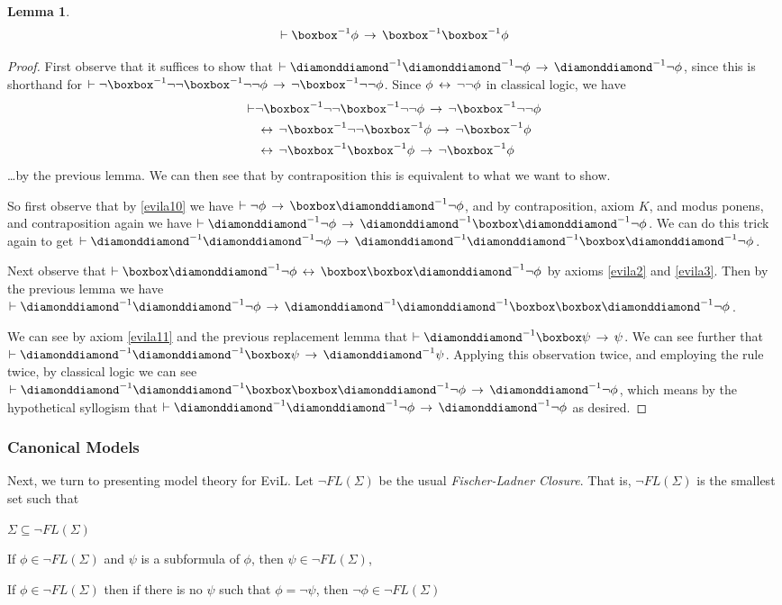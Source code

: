 \documentclass[11pt]{article}
\newtheorem{lemma}[theorem]{Lemma}
\newcommand{\BB}{\boxbox}
\newcommand{\DD}{\diamonddiamond}
\begin{document}
\begin{lemma}
\[ \vdash \BB^{-1} \phi \IMPL \BB^{-1}\BB^{-1}\phi \]
\end{lemma}
\begin{proof}
	\item First observe that it suffices to show that $\vdash\DD^{-1}\DD^{-1}\neg\phi \IMPL \DD^{-1}\neg\phi$, since this is shorthand for $\vdash\neg\BB^{-1}\neg\neg\BB^{-1}\neg\neg\phi \IMPL \neg\BB^{-1}\neg\neg\phi$.  Since $\phi \,\leftrightarrow\, \neg\neg\phi$ in classical logic, we have
	\begin{align*} \vdash & \neg\BB^{-1}\neg\neg\BB^{-1}\neg\neg\phi \IMPL \neg\BB^{-1}\neg\neg\phi \\
			& \IFF \neg\BB^{-1}\neg\neg\BB^{-1}\phi \IMPL \neg\BB^{-1}\phi\\
			& \IFF \neg\BB^{-1}\BB^{-1}\phi \IMPL \neg\BB^{-1}\phi \end{align*}
			\ldots by the previous lemma.  We can then see that by contraposition this is equivalent to what we want to show.
			
	So first observe that by \ref{evila10} we have $\vdash \neg \phi \IMPL \BB\DD^{-1} \neg \phi$, and by contraposition, axiom $K$, and modus ponens, and contraposition again we have $\vdash \DD^{-1} \neg \phi \IMPL \DD^{-1}\BB\DD^{-1} \neg \phi$.  We can do this trick again to get $\vdash \DD^{-1} \DD^{-1} \neg \phi \IMPL \DD^{-1} \DD^{-1}\BB\DD^{-1} \neg \phi$.
	
	Next observe that $\vdash \BB\DD^{-1}\neg \phi \IFF \BB \BB\DD^{-1}\neg \phi$ by axioms \ref{evila2} and \ref{evila3}.  Then by the previous lemma we have $\vdash \DD^{-1} \DD^{-1} \neg \phi \IMPL \DD^{-1} \DD^{-1}\BB\BB\DD^{-1} \neg \phi$.
	
	We can see by axiom \ref{evila11} and the previous replacement lemma that $\vdash \DD^{-1} \BB \psi \IMPL \psi$.  We can see further that $\vdash \DD^{-1} \DD^{-1} \BB \psi \IMPL \DD^{-1} \psi$.  Applying this observation twice, and employing the rule twice, by classical logic we can see $\vdash \DD^{-1} \DD^{-1}\BB\BB\DD^{-1} \neg \phi \IMPL \DD^{-1}\neg \phi$, which means by the hypothetical syllogism that $\vdash \DD^{-1} \DD^{-1} \neg \phi \IMPL \DD^{-1}\neg\phi$ as desired.
\end{proof}

\subsubsection{Canonical Models}

Next, we turn to presenting model theory for \textsf{EviL}.  Let $\neg FL(\Sigma)$ be the usual \emph{Fischer-Ladner Closure}.  That is, $\neg FL(\Sigma)$ is the smallest set such that
\begin{myroman}
\item  $\Sigma \subseteq \neg FL(\Sigma)$
\item If $\phi \in \neg FL(\Sigma)$ and $\psi$ is a subformula of $\phi$, then $\psi \in \neg FL(\Sigma)$, \item If $\phi \in \neg FL(\Sigma)$ then if there is no $\psi$ such that $\phi = \neg \psi$, then $\neg \phi \in \neg FL(\Sigma)$
\end{myroman}
\end{document}
